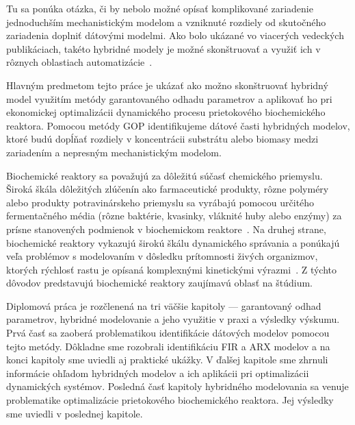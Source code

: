 Tu sa ponúka otázka, či by nebolo možné opísať komplikované zariadenie jednoduchším mechanistickým modelom a vzniknuté rozdiely od skutočného zariadenia doplniť dátovými modelmi. Ako bolo ukázané vo viacerých vedeckých publikáciach, takéto hybridné modely je možné skonštruovať a využiť ich v rôznych oblastiach automatizácie~\cite{hamilton:hybrid_modeling:2017, hernandez:economics_opt_w_mismatch:2019}.

Hlavným predmetom tejto práce je ukázať ako možno skonštruovať hybridný model využitím metódy garantovaného odhadu parametrov a aplikovať ho pri ekonomickej optimalizácii dynamického procesu prietokového biochemického reaktora. Pomocou metódy GOP identifikujeme dátové časti hybridných modelov, ktoré budú dopĺňať rozdiely v koncentrácii substrátu alebo biomasy medzi zariadením a nepresným mechanistickým modelom.

Biochemické reaktory sa považujú za dôležitú súčasť chemického priemyslu. Široká škála dôležitých zlúčenín ako farmaceutické produkty, rôzne polyméry alebo produkty potravinárskeho priemyslu sa vyrábajú pomocou určitého fermentačného média (rôzne baktérie, kvasinky, vláknité huby alebo enzýmy) za prísne stanovených podmienok v biochemickom reaktore~\cite{srinivasan:chemostat_opt:2003}. Na druhej strane, biochemické reaktory vykazujú širokú škálu dynamického správania a ponúkajú veľa problémov s modelovaním v dôsledku prítomnosti živých organizmov, ktorých rýchlosť rastu je opísaná komplexnými kinetickými výrazmi~\cite{psichogios:hybrid_process_model:1992}. Z týchto dôvodov predstavujú biochemické reaktory zaujímavú oblasť na štúdium.

Diplomová práca je rozčlenená na tri väčšie kapitoly --- garantovaný odhad parametrov, hybridné modelovanie a jeho využitie v praxi a výsledky výskumu. Prvá časť sa zaoberá problematikou identifikácie dátových modelov pomocou tejto metódy. Dôkladne sme rozobrali identifikáciu FIR a ARX modelov a na konci kapitoly sme uviedli aj praktické ukážky. V ďalšej kapitole sme zhrnuli informácie ohľadom hybridných modelov a ich aplikácii pri optimalizácii dynamických systémov. Posledná časť kapitoly hybridného modelovania sa venuje problematike optimalizácie prietokového biochemického reaktora. Jej výsledky sme uviedli v poslednej kapitole.
